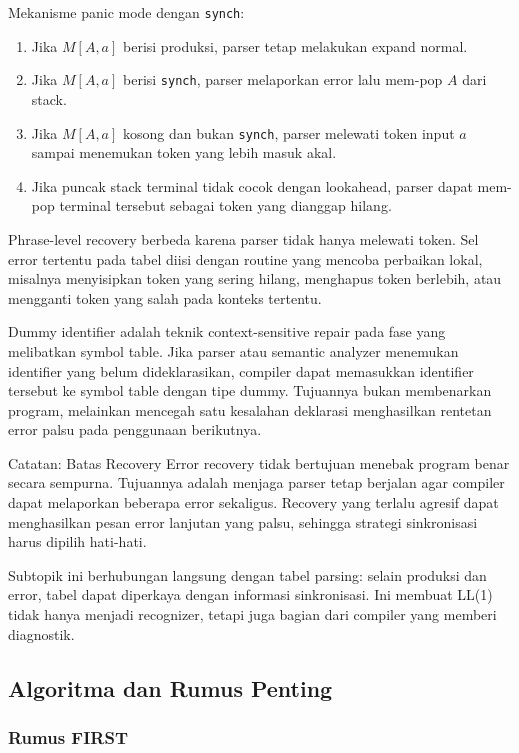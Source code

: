 Mekanisme panic mode dengan \texttt{synch}:
\begin{enumerate}
    \item Jika $M[A,a]$ berisi produksi, parser tetap melakukan expand normal.
    \item Jika $M[A,a]$ berisi \texttt{synch}, parser melaporkan error lalu mem-pop $A$ dari stack.
    \item Jika $M[A,a]$ kosong dan bukan \texttt{synch}, parser melewati token input $a$ sampai menemukan token yang lebih masuk akal.
    \item Jika puncak stack terminal tidak cocok dengan lookahead, parser dapat mem-pop terminal tersebut sebagai token yang dianggap hilang.
\end{enumerate}

Phrase-level recovery berbeda karena parser tidak hanya melewati token. Sel error tertentu pada tabel diisi dengan routine yang mencoba perbaikan lokal, misalnya menyisipkan token yang sering hilang, menghapus token berlebih, atau mengganti token yang salah pada konteks tertentu.

Dummy identifier adalah teknik context-sensitive repair pada fase yang melibatkan symbol table. Jika parser atau semantic analyzer menemukan identifier yang belum dideklarasikan, compiler dapat memasukkan identifier tersebut ke symbol table dengan tipe dummy. Tujuannya bukan membenarkan program, melainkan mencegah satu kesalahan deklarasi menghasilkan rentetan error palsu pada penggunaan berikutnya.

\begin{cmt}{Catatan: Batas Recovery}{}
Error recovery tidak bertujuan menebak program benar secara sempurna. Tujuannya adalah menjaga parser tetap berjalan agar compiler dapat melaporkan beberapa error sekaligus. Recovery yang terlalu agresif dapat menghasilkan pesan error lanjutan yang palsu, sehingga strategi sinkronisasi harus dipilih hati-hati.
\end{cmt}

Subtopik ini berhubungan langsung dengan tabel parsing: selain produksi dan error, tabel dapat diperkaya dengan informasi sinkronisasi. Ini membuat LL(1) tidak hanya menjadi recognizer, tetapi juga bagian dari compiler yang memberi diagnostik.

\subsection{Algoritma dan Rumus Penting}

\subsubsection{Rumus FIRST}

